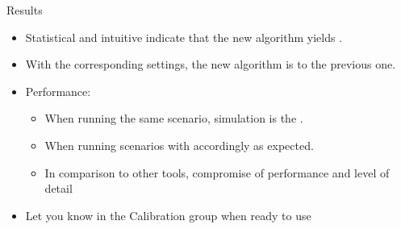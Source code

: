 
\begin{frame}[fragile]{Results}
  \begin{itemize}
    \item Statistical  and intuitive  indicate that the new algorithm yields . \checkmark
    \item With the corresponding settings, the new algorithm is  to the previous one. \checkmark
    \item Performance:
    \begin{itemize}
      \item When running the same scenario, simulation  is the . \checkmark
      \item When running scenarios with  accordingly as expected.
      \item In comparison to other tools, \alert{compromise} of \alert{performance} and \alert{level of detail}
    \end{itemize}

    \item Let you know in the Calibration group when ready to use
  \end{itemize}
\end{frame}
